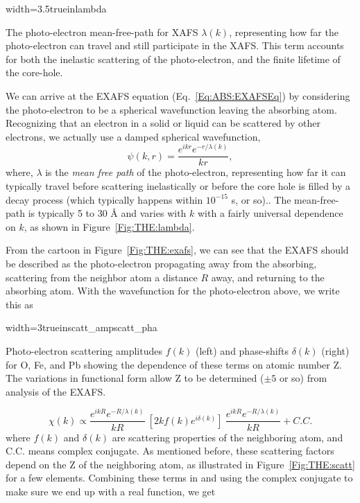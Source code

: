 \begin{Nfig}{width=3.5truein}{lambda}
  \caption{The photo-electron mean-free-path for XAFS $\lambda(k)$,
    representing how far the photo-electron can travel and still participate
    in the XAFS.  This term accounts for both the inelastic scattering of the
    photo-electron, and the finite lifetime of the core-hole.}
  \label{Fig:THE:lambda}
\end{Nfig}

We can arrive at the EXAFS equation (Eq.~\ref{Eq:ABS:EXAFSEq}) by
considering the photo-electron to be a spherical wavefunction leaving the
absorbing atom.  Recognizing that an electron in a solid or liquid can be
scattered by other electrons, we actually use a damped spherical
wavefunction,
\begin{equation}
  \psi(k,r) = {\frac{e^{ikr} e^{-r/\lambda(k)}}{kr}},
    \label{Eq:damped}
\end{equation}
\noindent
where, $\lambda$ is the {\emph{mean free path}} of the photo-electron,
representing how far it can typically travel before scattering
inelastically or before the core hole is filled by a decay process (which
typically happens within $10^{-15}$ s, or so)..  The mean-free-path is
typically 5 to 30 {\AA} and varies with $k$ with a fairly universal
dependence on $k$, as shown in Figure~\ref{Fig:THE:lambda}.

From the cartoon in Figure~\ref{Fig:THE:exafs}, we can see that the EXAFS
should be described as the photo-electron propagating away from the
absorbing, scattering from the neighbor atom a distance $R$ away, and
returning to the absorbing atom.  With the wavefunction for the
photo-electron above, we write this as

\begin{Sfig}{width=3truein}{scatt_amp}{scatt_pha}
  \caption{Photo-electron scattering amplitudes $f(k)$ (left) and
    phase-shifts $\delta(k)$ (right) for O, Fe, and Pb showing the
    dependence of these terms on atomic number Z. The variations in
    functional form allow Z to be determined ($\pm 5$ or so) from analysis
    of the EXAFS.}
  \label{Fig:THE:scatt}
\end{Sfig}

\begin{equation}
  \chi(k) \propto   {\frac{e^{ikR}e^{-R/\lambda(k)}}{kR}}\>
    [{2k f(k)e^{i\delta(k)}}] \>  {\frac{e^{ikR} e^{-R/\lambda(k)}}{kR}} + C.C.
    \label{Eq:xafs0}
\end{equation}
\noindent
where $f(k)$ and $\delta(k)$ are scattering properties of the neighboring
atom, and C.C. means complex conjugate.  As mentioned before, these
scattering factors depend on the Z of the neighboring atom, as illustrated
in Figure~\ref{Fig:THE:scatt} for a few elements.  Combining these terms in
and using the complex conjugate to make sure we end up with a real
function, we get

